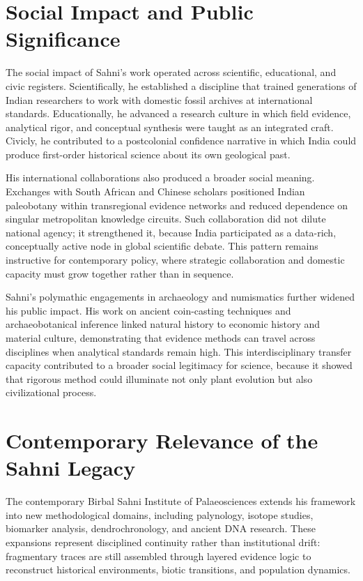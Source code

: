 \documentclass[10pt]{article}
\begin{document}
\section*{Social Impact and Public Significance}
The social impact of Sahni's work operated across scientific, educational, and civic registers. Scientifically, he established a discipline that trained generations of Indian researchers to work with domestic fossil archives at international standards. Educationally, he advanced a research culture in which field evidence, analytical rigor, and conceptual synthesis were taught as an integrated craft. Civicly, he contributed to a postcolonial confidence narrative in which India could produce first-order historical science about its own geological past.\cite{from_lahore_lucknow,bsip_history,science_state_nation}

His international collaborations also produced a broader social meaning. Exchanges with South African and Chinese scholars positioned Indian paleobotany within transregional evidence networks and reduced dependence on singular metropolitan knowledge circuits. Such collaboration did not dilute national agency; it strengthened it, because India participated as a data-rich, conceptually active node in global scientific debate. This pattern remains instructive for contemporary policy, where strategic collaboration and domestic capacity must grow together rather than in sequence.\cite{regionalism_mobilism,du_toit_wadia,trans_himalayan_article,trans_himalayan_pdf}

Sahni's polymathic engagements in archaeology and numismatics further widened his public impact. His work on ancient coin-casting techniques and archaeobotanical inference linked natural history to economic history and material culture, demonstrating that evidence methods can travel across disciplines when analytical standards remain high. This interdisciplinary transfer capacity contributed to a broader social legitimacy for science, because it showed that rigorous method could illuminate not only plant evolution but also civilizational process.\cite{palaeobot_bio,wiki_birbal,from_lahore_lucknow}

\section*{Contemporary Relevance of the Sahni Legacy}
The contemporary Birbal Sahni Institute of Palaeosciences extends his framework into new methodological domains, including palynology, isotope studies, biomarker analysis, dendrochronology, and ancient DNA research. These expansions represent disciplined continuity rather than institutional drift: fragmentary traces are still assembled through layered evidence logic to reconstruct historical environments, biotic transitions, and population dynamics.\cite{isti_bsip,palaeoscience_today,sponsored_projects,dna_lab}
\end{document}
